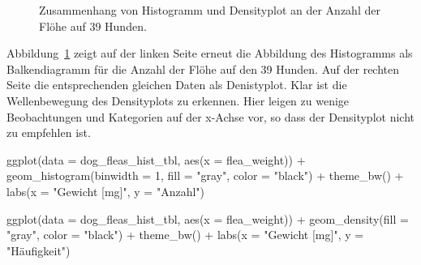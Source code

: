 \documentclass[
  letterpaper,
  DIV=11,
  oneside]{scrreport}
\newenvironment{Shaded}{\begin{snugshade}}{\end{snugshade}}
\newcommand{\AttributeTok}[1]{\textcolor[rgb]{0.40,0.45,0.13}{#1}}
\newcommand{\DecValTok}[1]{\textcolor[rgb]{0.68,0.00,0.00}{#1}}
\newcommand{\FunctionTok}[1]{\textcolor[rgb]{0.28,0.35,0.67}{#1}}
\newcommand{\NormalTok}[1]{\textcolor[rgb]{0.00,0.23,0.31}{#1}}
\newcommand{\SpecialCharTok}[1]{\textcolor[rgb]{0.37,0.37,0.37}{#1}}
\newcommand{\StringTok}[1]{\textcolor[rgb]{0.13,0.47,0.30}{#1}}
\begin{document}
\begin{figure}
\begin{minipage}[t]{0.50\linewidth}
{{}

}

\end{minipage}%

\caption{\label{fig-dens-flea-1}Zusammenhang von Histogramm und
Densityplot an der Anzahl der Flöhe auf 39 Hunden.}

\end{figure}

Abbildung~\ref{fig-dens-flea-1} zeigt auf der linken Seite erneut die
Abbildung des Histogramms als Balkendiagramm für die Anzahl der Flöhe
auf den 39 Hunden. Auf der rechten Seite die entsprechenden gleichen
Daten als Denistyplot. Klar ist die Wellenbewegung des Densityplots zu
erkennen. Hier leigen zu wenige Beobachtungen und Kategorien auf der
x-Achse vor, so dass der Densityplot nicht zu empfehlen ist.

\begin{Shaded}
\begin{Highlighting}[]
\FunctionTok{ggplot}\NormalTok{(}\AttributeTok{data =}\NormalTok{ dog\_fleas\_hist\_tbl, }\FunctionTok{aes}\NormalTok{(}\AttributeTok{x =}\NormalTok{ flea\_weight)) }\SpecialCharTok{+}
  \FunctionTok{geom\_histogram}\NormalTok{(}\AttributeTok{binwidth =} \DecValTok{1}\NormalTok{, }\AttributeTok{fill =} \StringTok{"gray"}\NormalTok{, }\AttributeTok{color =} \StringTok{"black"}\NormalTok{) }\SpecialCharTok{+}
  \FunctionTok{theme\_bw}\NormalTok{() }\SpecialCharTok{+}
  \FunctionTok{labs}\NormalTok{(}\AttributeTok{x =} \StringTok{"Gewicht [mg]"}\NormalTok{, }\AttributeTok{y =} \StringTok{"Anzahl"}\NormalTok{) }

\FunctionTok{ggplot}\NormalTok{(}\AttributeTok{data =}\NormalTok{ dog\_fleas\_hist\_tbl, }\FunctionTok{aes}\NormalTok{(}\AttributeTok{x =}\NormalTok{ flea\_weight)) }\SpecialCharTok{+}
  \FunctionTok{geom\_density}\NormalTok{(}\AttributeTok{fill =} \StringTok{"gray"}\NormalTok{, }\AttributeTok{color =} \StringTok{"black"}\NormalTok{) }\SpecialCharTok{+}
  \FunctionTok{theme\_bw}\NormalTok{() }\SpecialCharTok{+}
  \FunctionTok{labs}\NormalTok{(}\AttributeTok{x =} \StringTok{"Gewicht [mg]"}\NormalTok{, }\AttributeTok{y =} \StringTok{"Häufigkeit"}\NormalTok{) }
\end{Highlighting}
\end{Shaded}
\end{document}
